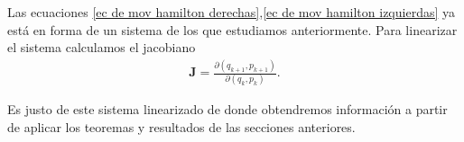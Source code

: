 Las ecuaciones \ref{ec de mov hamilton derechas},\ref{ec de mov hamilton izquierdas} ya está en forma de un sistema de los que estudiamos anteriormente. Para linearizar el sistema calculamos el jacobiano
\begin{eqnarray}
\mathbf{J}=\frac{\partial(q_{k+1},p_{k+1})}{\partial(q_{k},p_{k})}.
\end{eqnarray}

Es justo de este sistema linearizado de donde obtendremos información a partir de aplicar los teoremas y resultados de las secciones anteriores. 









